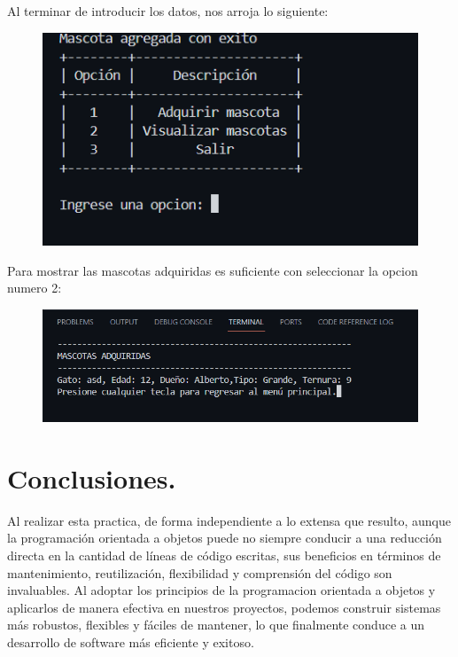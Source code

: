 \documentclass[12pt]{article}
\begin{document}
Al terminar de introducir los datos, nos arroja lo siguiente:
\begin{figure}[H]
		\begin{center}
 			\includegraphics[width = .7\textwidth]{18.png}
 			
 			
 			 	
		\end{center} 
\end{figure}

Para mostrar las mascotas adquiridas es suficiente con seleccionar la opcion numero 2:
\begin{figure}[H]
		\begin{center}
 			\includegraphics[width = .7\textwidth]{19.png}
 			
 			 	
		\end{center} 
\end{figure}

\section{Conclusiones.}
Al realizar esta practica, de forma independiente a lo extensa que resulto, 
aunque la programación orientada a objetos puede no siempre conducir a una reducción directa en la cantidad de líneas de código escritas, sus beneficios en términos de mantenimiento, reutilización, flexibilidad y comprensión del código son invaluables. Al adoptar los principios de la programacion orientada a objetos y aplicarlos de manera efectiva en nuestros proyectos, podemos construir sistemas más robustos, flexibles y fáciles de mantener, lo que finalmente conduce a un desarrollo de software más eficiente y exitoso.









 
\end{document}
